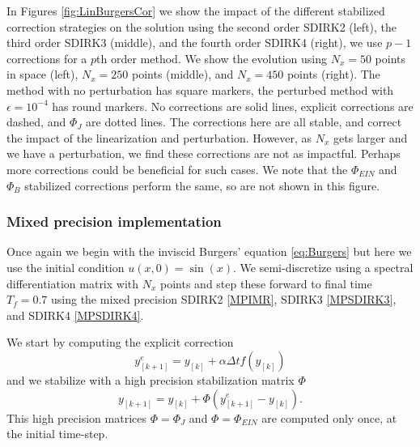 \documentclass{siamart251104}
\newcommand{\dt}{\Delta t}
\begin{document}
In Figures \ref{fig:LinBurgersCor} we show the impact of the 
different stabilized correction strategies on the solution using 
the second order SDIRK2 (left), the third order
SDIRK3 (middle), and the fourth order SDIRK4 (right),
we use $p-1$ corrections for a $p$th order method.
We show the evolution using  $N_x=50$ points in space (left),
$N_x =250$  points (middle), and $N_x =450$  points (right). 
The method with no perturbation has square markers, the 
perturbed method with $\epsilon = 10^{-4}$ has round markers.
No corrections are solid lines, explicit corrections are dashed,
and $\Phi_J$ are dotted lines.
The corrections here are all stable, and correct the impact of the 
linearization and perturbation. However, as $N_x$ gets larger and we have a perturbation,
we find these corrections are not as impactful. Perhaps more
corrections could be beneficial for such cases.
We note that the $\Phi_{EIN}$ and $\Phi_B$  stabilized corrections  perform the same, 
so are not shown in this figure.

\subsubsection{Mixed precision implementation}
 Once again we begin with the inviscid Burgers' equation \eqref{eq:Burgers}
but  here we use the   initial condition $u(x,0)=  \sin(x)$. 
 We semi-discretize using a spectral differentiation matrix with $N_x$ points
 and step these forward to final time $T_f =0.7$
 using the mixed precision SDIRK2 \eqref{MPIMR}, SDIRK3 \eqref{MPSDIRK3}, 
 and SDIRK4 \eqref{MPSDIRK4}.

We start by computing the explicit correction
 \[ y^e_{[k+1]} =  y_{[k]}  + \alpha \dt f(y_{[k]})\]
and we stabilize with a high precision stabilization matrix $\Phi$
 \[ y_{[k+1]} =  y_{[k]}  + \Phi \left(y_{[k+1]}^e -y_{[k]} \right). \]
This high precision matrices $\Phi = \Phi_J$  and $\Phi =  \Phi_{EIN}$
are computed only once, at the initial time-step.
\end{document}
